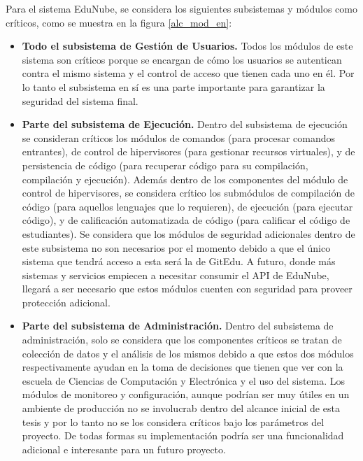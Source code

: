 Para el sistema EduNube, se considera los siguientes subsistemas y módulos como críticos, como se muestra en la figura \ref{alc_mod_en}:
\begin{itemize}
	\item \textbf{Todo el subsistema de Gestión de Usuarios.} Todos los módulos de este sistema son críticos porque se encargan de cómo los usuarios se autentican contra el mismo sistema y el control de acceso que tienen cada uno en él. Por lo tanto el subsistema en sí es una parte importante para garantizar la seguridad del sistema final.
	\item \textbf{Parte del subsistema de Ejecución.} Dentro del subsistema de ejecución se consideran críticos los módulos de comandos (para procesar comandos entrantes), de control de hipervisores (para gestionar recursos virtuales), y de persistencia de código (para recuperar código para su compilación, compilación y ejecución).  Además dentro de los componentes del módulo de control de hipervisores, se considera crítico los submódulos de compilación de código (para aquellos lenguajes que lo requieren), de ejecución (para ejecutar código), y de calificación automatizada de código (para calificar el código de estudiantes). Se considera que los módulos de seguridad adicionales dentro de este subsistema no son necesarios por el momento debido a que el único sistema que tendrá acceso a esta será la de GitEdu. A futuro, donde más sistemas y servicios empiecen a necesitar consumir el API de EduNube, llegará a ser necesario que estos módulos cuenten con seguridad para proveer protección adicional.
	\item \textbf{Parte del subsistema de Administración.} Dentro del subsistema de administración, solo se considera que los componentes críticos se tratan de colección de datos y el análisis de los mismos debido a que estos dos módulos respectivamente ayudan en la toma de decisiones que tienen que ver con la escuela de Ciencias de Computación y Electrónica y el uso del sistema. Los módulos de monitoreo y configuración, aunque podrían ser muy útiles en un ambiente de producción no se involucrab dentro del alcance inicial de esta tesis y por lo tanto no se los considera críticos bajo los parámetros del proyecto. De todas formas su implementación podría ser una funcionalidad adicional e interesante para un futuro proyecto.
\end{itemize}

